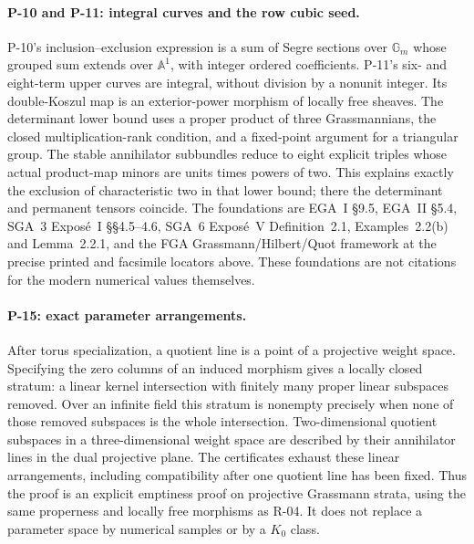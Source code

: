 \paragraph{P-10 and P-11: integral curves and the row cubic seed.}
P-10's inclusion--exclusion expression is a sum of Segre sections over
$\mathbb G_m$ whose grouped sum extends over $\mathbb A^1$, with
integer ordered coefficients. P-11's six- and eight-term upper
curves are integral, without division by a nonunit integer.
Its double-Koszul map is an exterior-power morphism of locally
free sheaves. The determinant lower bound uses a proper product
of three Grassmannians, the closed multiplication-rank condition,
and a fixed-point argument for a triangular group. The stable
annihilator subbundles reduce to eight explicit triples whose
actual product-map minors are units times powers of two. This
explains exactly the exclusion of characteristic two in that
lower bound; there the determinant and permanent tensors coincide.
The foundations are EGA~I \S9.5, EGA~II \S5.4, SGA~3 Expos\'e~I
\S\S4.5--4.6, SGA~6 Expos\'e~V Definition~2.1, Examples~2.2(b)
and Lemma~2.2.1, and the FGA Grassmann/Hilbert/Quot framework at
the precise printed and facsimile locators above. These foundations
are not citations for the modern numerical values themselves.

\paragraph{P-15: exact parameter arrangements.}
After torus specialization, a quotient line is a point of a
projective weight space. Specifying the zero columns of an
induced morphism gives a locally closed stratum: a linear kernel
intersection with finitely many proper linear subspaces removed.
Over an infinite field this stratum is nonempty precisely when
none of those removed subspaces is the whole intersection.
Two-dimensional quotient subspaces in a three-dimensional weight
space are described by their annihilator lines in the dual
projective plane. The certificates exhaust these linear
arrangements, including compatibility after one quotient line
has been fixed. Thus the proof is an explicit emptiness proof
on projective Grassmann strata, using the same properness and
locally free morphisms as R-04. It does not replace a parameter
space by numerical samples or by a $K_0$ class.


